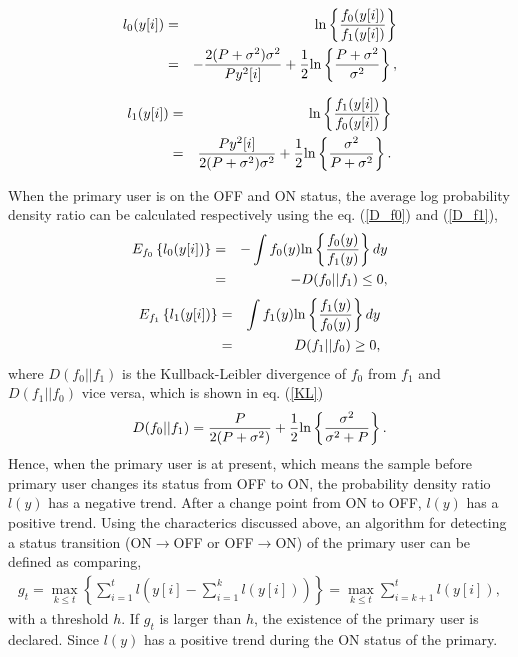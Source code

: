 \begin{eqnarray}
l_{0}(y[i]) &=& {\rm ln}\left\{\frac{f_0(y[i])}{f_1(y[i])}\right\} \label{like1} \\ 
&=& -\frac{2(P+\sigma^2)\sigma^2}{Py^2[i]} + \frac{1}{2}{\rm ln}\left\{\frac{P+\sigma^2}{\sigma^2}\right\}, \nonumber
\end{eqnarray}

\begin{eqnarray}
l_{1}(y[i]) &=& {\rm ln}\left\{\frac{f_1(y[i])}{f_0(y[i])}\right\} \label{like2} \\ 
&=& \frac{Py^2[i]}{2(P+\sigma^2)\sigma^2} + \frac{1}{2}{\rm ln}\left\{\frac{\sigma^2}{P+\sigma^2}\right\}. \nonumber
\end{eqnarray}

When the primary user is on the OFF and ON status, the average log probability density ratio can be calculated respectively using the eq. (\ref{D_f0}) and (\ref{D_f1}),
\begin{eqnarray}
E_{f_0}\left\{l_0(y[i])\right\} &=& -\int f_0(y){\rm ln}\left\{\frac{f_0(y)}{f_1(y)}\right\}dy \nonumber \\ 
&=&-D(f_0||f_1)\leq 0, \label{D_f0} 
\end{eqnarray}
\begin{eqnarray}
E_{f_1}\left\{l_1(y[i])\right\} &=& \int f_1(y){\rm ln}\left\{\frac{f_1(y)}{f_0(y)}\right\}dy \nonumber \\
&=& D(f_1||f_0)\geq 0 \label{D_f1},
\end{eqnarray}
where $D(f_0||f_1)$ is the Kullback-Leibler divergence of $f_0$ from $f_1$ and $D(f_1||f_0)$ vice versa, which is shown in eq. (\ref{KL})
\begin{eqnarray}
D(f_0||f_1)=\frac{P}{2(P+\sigma^2)}+\frac{1}{2}{\rm ln}\left\{\frac{\sigma^2}{\sigma^2+P}\right\}.
\label{KL}
\end{eqnarray}
Hence, when the primary user is at present, which means the sample before primary user changes its status from OFF to ON, the probability density ratio $l(y)$ has a negative trend. After a change point from ON to OFF, $l(y)$ has a positive trend.
Using the characterics discussed above, an algorithm for detecting a status transition (ON$\rightarrow$OFF or OFF$\rightarrow$ON) of the primary user can be defined as comparing,  
\begin{eqnarray}
g_t =  \max_{k \leq t}\left\{\sum_{i=1}^tl(y[i]-\sum_{i=1}^kl(y[i]))\right\}=\max_{k \leq t}\sum_{i=k+1}^tl(y[i]),
\label{Cusum}
\end{eqnarray}
with a threshold $h$. If $g_t$ is larger than $h$, the existence of the primary user is declared. Since $l(y)$ has a positive trend during the ON status of the primary.

